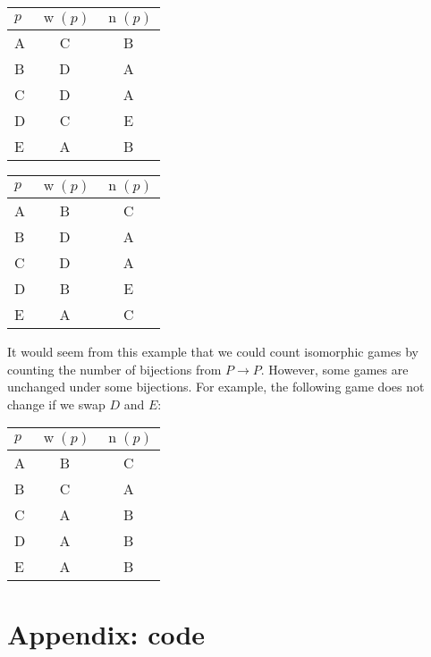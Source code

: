 \documentclass[12pt,x11names, rgb]{article}
\DeclareMathOperator{\w}{w}
\DeclareMathOperator{\n}{n}
\begin{document}
    \begin{center}
    \begin{multicols}{2}
        \begin{tabular}{l | c | c}
             $p$ & $\w(p)$ & $\n(p)$ \\
             \hline
             A &  C& B\\
             B &  D& A\\
             C &  D& A\\
             D &  C& E\\
             E &  A& B\\
        \end{tabular}


        \columnbreak
        \begin{tabular}{l | c | c}
             $p$ & $\w(p)$ & $\n(p)$ \\
             \hline
             A &  B& C\\
             B &  D& A\\
             C &  D& A\\
             D &  B& E\\
             E &  A& C\\
        \end{tabular}
    \end{multicols}
    \end{center}

    It would seem from this example that we could count isomorphic games by counting the number of bijections from $P\to P$. However, some games are unchanged under some bijections. For example, the following game does not change if we swap $D$ and $E$:

    \begin{center}
        \begin{tabular}{l | c | c}
             $p$ & $\w(p)$ & $\n(p)$ \\
             \hline
             A &  B& C\\
             B &  C& A\\
             C &  A& B\\
             D &  A& B\\
             E &  A& B\\
        \end{tabular}
    \end{center}


\section{Appendix: code}
    \renewcommand{\ttdefault}{pcr}
\end{document}

